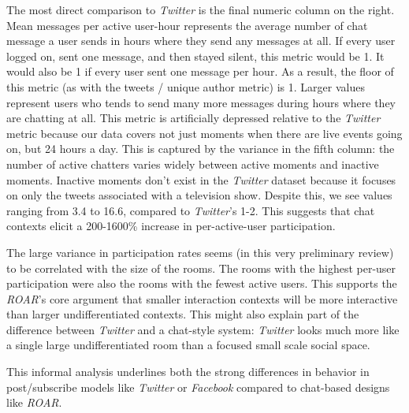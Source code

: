 The most direct comparison to \emph{Twitter} is the final numeric column on the right. Mean messages per active user-hour represents the average number of chat message a user sends in hours where they send any messages at all. If every user logged on, sent one message, and then stayed silent, this metric would be 1. It would also be 1 if every user sent one message per hour. As a result, the floor of this metric (as with the tweets / unique author metric) is 1. Larger values represent users who tends to send many more messages during hours where they are chatting at all. This metric is artificially depressed relative to the \emph{Twitter} metric because our data covers not just moments when there are live events going on, but 24 hours a day. This is captured by the variance in the fifth column: the number of active chatters varies widely between active moments and inactive moments. Inactive moments don't exist in the \emph{Twitter} dataset because it focuses on only the tweets associated with a television show. Despite this, we see values ranging from 3.4 to 16.6, compared to \emph{Twitter}'s 1-2. This suggests that chat contexts elicit a 200-1600\% increase in per-active-user participation. 

The large variance in participation rates seems (in this very preliminary review) to be correlated with the size of the rooms. The rooms with the highest per-user participation were also the rooms with the fewest active users. This supports the \emph{ROAR}'s core argument that smaller interaction contexts will be more interactive than larger undifferentiated contexts. This might also explain part of the difference between \emph{Twitter} and a chat-style system: \emph{Twitter} looks much more like a single large undifferentiated room than a focused small scale social space.

This informal analysis underlines both the strong differences in behavior in post/subscribe models like \emph{Twitter} or \emph{Facebook} compared to chat-based designs like \emph{ROAR}.






